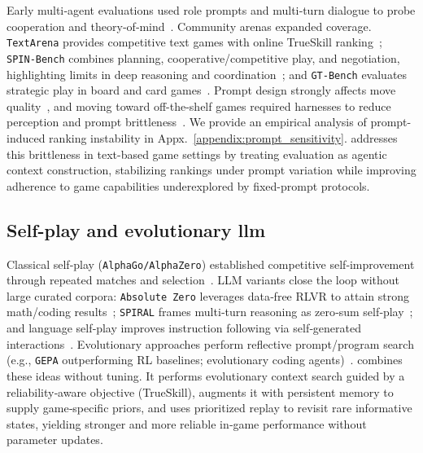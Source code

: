 Early multi‑agent evaluations used role prompts and multi‑turn dialogue to probe cooperation and theory‑of‑mind~\citep{abdelnabi2024cooperation}. Community arenas expanded coverage. \texttt{TextArena} provides competitive text games with online TrueSkill ranking~\citep{guertler2025textarena}; \texttt{SPIN‑Bench} combines planning, cooperative/competitive play, and negotiation, highlighting limits in deep reasoning and coordination~\citep{yao2025spin}; and \texttt{GT‑Bench} evaluates strategic play in board and card games~\citep{duan2024gtbench}. Prompt design strongly affects move quality~\citep{topsakal2024evaluating}, and moving toward off-the-shelf games required harnesses to reduce perception and prompt brittleness~\citep{hu2025lmgamebenchgoodllmsplaying}. We provide an empirical analysis of prompt-induced ranking instability in Appx.~\ref{appendix:prompt_sensitivity}. \NAME{} addresses this brittleness in text-based game settings by treating evaluation as agentic context construction, stabilizing rankings under prompt variation while improving adherence to game capabilities underexplored by fixed-prompt protocols.


\subsection{Self-play and evolutionary llm}

Classical self‑play (\texttt{AlphaGo/AlphaZero}) established competitive self‑improvement through repeated matches and selection~\citep{silver2017mastering,silver2016mastering}. LLM variants close the loop without large curated corpora: \texttt{Absolute Zero} leverages data‑free RLVR to attain strong math/coding results~\citep{zhao2025absolute}; \texttt{SPIRAL} frames multi‑turn reasoning as zero‑sum self‑play~\citep{liu2025spiral}; and language self‑play improves instruction following via self‑generated interactions~\citep{kuba2025language}. Evolutionary approaches perform reflective prompt/program search (e.g., \texttt{GEPA} outperforming RL baselines; evolutionary coding agents)~\citep{agrawal2025gepa,novikov2025alphaevolve}. \NAME{} combines these ideas without tuning. It performs evolutionary context search guided by a reliability‑aware objective (TrueSkill), augments it with persistent memory to supply game‑specific priors, and uses prioritized replay to revisit rare informative states, yielding stronger and more reliable in‑game performance without parameter updates.